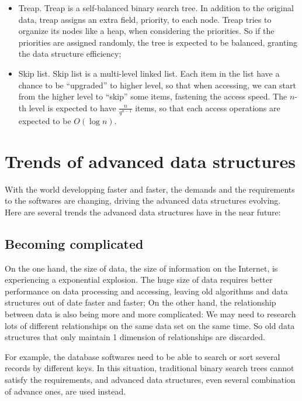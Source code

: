 \documentclass[scheme=plain,12pt]{ctexart}
\begin{document}
    \begin{itemize}
        \item Treap. Treap is a self-balanced binary search tree. In addition to the original
              data, treap assigns an extra field, priority, to each node. Treap tries to organize
              its nodes like a heap, when considering the priorities. So if the priorities are
              assigned randomly, the tree is expected to be balanced, granting the data structure
              efficiency;
        \item Skip list. Skip list is a multi-level linked list. Each item in the list have a
              chance to be ``upgraded'' to higher level, so that when accessing, we can start
              from the higher level to ``skip'' some items, fastening the access speed. The
              $n$-th level is expected to have $\frac{n}{q^{n-1}}$ items, so that each access
              operations are expected to be $O(\log n)$.
    \end{itemize}

    \section{Trends of advanced data structures}

    With the world developping faster and faster, the demands and the requirements to the
    softwares are changing, driving the advanced data structures evolving. Here are several
    trends the advanced data structures have in the near future:

    \subsection{Becoming complicated}

    On the one hand, the size of data, the size of information on the Internet, is experiencing
    a exponential explosion. The huge size of data requires better performance on data processing
    and accessing, leaving old algorithms and data structures out of date faster and faster; On
    the other hand, the relationship between data is also being more and more complicated: We
    may need to research lots of different relationships on the same data set on the same time.
    So old data structures that only maintain 1 dimension of relationships are discarded.

    For example, the database softwares need to be able to search or sort several records by
    different keys. In this situation, traditional binary search trees cannot satisfy the
    requirements, and advanced data structures, even several combination of advance ones, are
    used instead.
\end{document}

